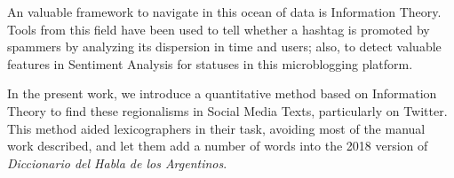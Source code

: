 An valuable framework to navigate in this ocean of data is Information Theory. Tools from this field have been used to tell whether a hashtag is promoted by spammers \cite{Cui:2012:DBE:2396761.2398519, ghosh2011entropy} by analyzing its dispersion in time and users; also, to detect valuable features in Sentiment Analysis for statuses in this microblogging platform\cite{pak2010twitter}.

In the present work, we introduce a quantitative method based on Information Theory to find these regionalisms in Social Media Texts, particularly on Twitter. This method aided lexicographers in their task, avoiding most of the manual work described, and let them add a number of words into the 2018 version of \emph{Diccionario del Habla de los Argentinos}.